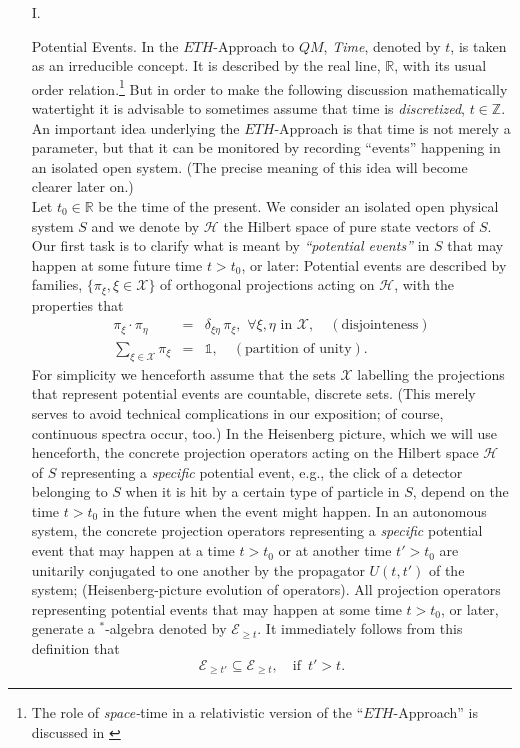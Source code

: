\documentclass[12pt]{article}
\begin{document}
\begin{enumerate}
\item[I.]{{Potential Events}. In the $\textit{ETH}$-Approach to $QM$, \textit{Time}, denoted by $t$, is taken as an irreducible concept. It is described by the real line, $\mathbb{R}$, with its usual order relation.\footnote{The role of \textit{space-}time in a relativistic version of the ``$\textit{ETH}$-Approach'' is discussed in \cite{Fr}} But in order to make the following discussion mathematically watertight it is advisable to sometimes assume that time is \textit{discretized}, $t \in \mathbb{Z}$. An important idea underlying the $\textit{ETH}$-Approach is that time is not merely a parameter, but that it can be monitored by recording ``events'' happening in an isolated open system. (The precise meaning of this idea will become clearer later on.)
\\Let $t_0 \in \mathbb{R}$ be the time of the present. We consider an isolated open physical system $S$ and we denote by $\mathcal{H}$ the Hilbert space of pure state vectors of $S$. Our first task is to clarify what is meant by \textit{``potential events''} in $S$ that may happen at some future time $t>t_0$, or later: Potential events are described by families, $\lbrace \pi_{\xi}, \xi \in \mathcal{X} \rbrace$ of orthogonal projections acting on $\mathcal{H}$, with the properties that 
\begin{eqnarray}\label{pot-event}
\pi_{\xi}\cdot \pi_{\eta} &=& \delta_{\xi \eta}\, \pi_{\xi}, \,\,\forall \xi, \eta \,\,\text{in} \,\,\mathcal{X}, \quad(\text{disjointeness}) \nonumber\\
\sum_{\xi \in \mathcal{X}} \pi_{\xi}& =& {\mathds{1}}, \quad(\text{partition of unity}).
\end{eqnarray}
For simplicity we henceforth assume that the sets $\mathcal{X}$ labelling the projections that represent potential events are countable, discrete sets. (This merely serves to avoid technical complications in our exposition; of course, continuous spectra occur, too.)
In the Heisenberg picture, which we will use henceforth, the concrete projection operators acting on the Hilbert space 
$\mathcal{H}$ of $S$ representing a \textit{specific} potential event, e.g., the click of a detector belonging to $S$ when it is hit by a certain type of particle in $S$, depend on the time $t>t_{0}$ in the future when the event might happen. In an autonomous system, the concrete projection operators representing a \textit{specific} potential event that may happen at a time $t>t_0$ or at another time $t'>t_0$ are unitarily conjugated to one another by the propagator $U(t,t')$ of the system; (Heisenberg-picture evolution of operators). All projection operators representing potential events that may happen at some time $t>t_0$, or later, generate a $^{*}$-algebra denoted by $\mathcal{E}_{\geq t}$. It immediately follows from this definition that 
$$\mathcal{E}_{\geq t'} \subseteq \mathcal{E}_{\geq t}, \quad \text{if   }\, t'>t.$$

}
\end{enumerate}
\end{document}
